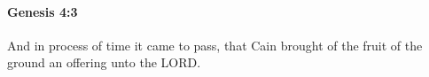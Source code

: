 
		\paragraph{Genesis 4:3} %
			\label{GENESIS-4-3}

			And in process of time it came to pass, that Cain brought of the fruit of the ground an offering unto the LORD.


